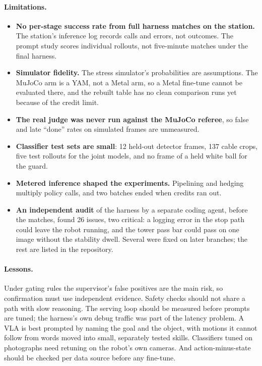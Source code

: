 \documentclass[10pt]{article}
\begin{document}
\paragraph{Limitations.}
\begin{itemize}
  \item \textbf{No per-stage success rate from full harness matches on the station.} The station's inference log records calls and errors,
  not outcomes. The prompt study scores individual rollouts, not five-minute matches under the final harness.
  \item \textbf{Simulator fidelity.} The stress simulator's probabilities are assumptions. The MuJoCo arm is a YAM, not a Metal arm, so a Metal
  fine-tune cannot be evaluated there, and the rebuilt table has no clean comparison runs yet because of the credit limit.
  \item \textbf{The real judge was never run against the MuJoCo referee}, so false and late ``done'' rates on simulated frames are unmeasured.
  \item \textbf{Classifier test sets are small}: 12 held-out detector frames, 137 cable crops, five test rollouts for the joint models, and no
  frame of a held white ball for the guard.
  \item \textbf{Metered inference shaped the experiments.} Pipelining and hedging multiply policy calls, and two batches ended when credits ran
  out.
  \item \textbf{An independent audit} of the harness by a separate coding agent, before the matches, found 26 issues, two critical: a logging error
  in the stop path could leave the robot running, and the tower pass bar could pass on one image without the stability dwell. Several were fixed on
  later branches; the rest are listed in the repository.
\end{itemize}

\paragraph{Lessons.} Under gating rules the supervisor's false positives are the main risk, so confirmation must use independent evidence.
Safety checks should not share a path with slow reasoning. The serving loop should be measured before prompts are tuned; the harness's own debug traffic
was part of the latency problem. A VLA is best prompted by naming the goal and the object, with motions it cannot follow from words moved into
small, separately tested skills. Classifiers tuned on photographs need retuning on the robot's own cameras. And action-minus-state should be
checked per data source before any fine-tune.
\end{document}
